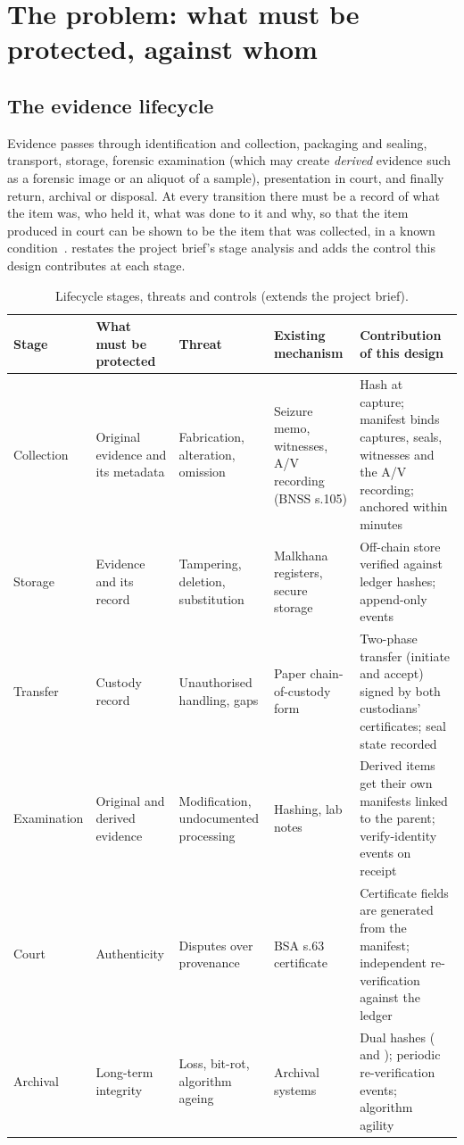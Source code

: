 \section{The problem: what must be protected, against whom}
\label{sec:problem}

\subsection{The evidence lifecycle}
Evidence passes through identification and collection, packaging and sealing, transport, storage, forensic examination (which may create \emph{derived} evidence such as a forensic image or an aliquot of a sample), presentation in court, and finally return, archival or disposal. At every transition there must be a record of what the item was, who held it, what was done to it and why, so that the item produced in court can be shown to be the item that was collected, in a known condition~\cite{iso27037,sopbnss}.  restates the project brief's stage analysis and adds the control this design contributes at each stage.

\begin{table}[htbp]
\centering\small
\begin{tabularx}{\linewidth}{@{}l>{\raggedright}p{2.6cm}>{\raggedright}p{2.5cm}>{\raggedright}p{2.6cm}X@{}}
\toprule
Stage & What must be protected & Threat & Existing mechanism & Contribution of this design \\
\midrule
Collection & Original evidence and its metadata & Fabrication, alteration, omission & Seizure memo, witnesses, A/V recording (BNSS s.105) & Hash at capture; manifest binds captures, seals, witnesses and the A/V recording; anchored within minutes \\
Storage & Evidence and its record & Tampering, deletion, substitution & Malkhana registers, secure storage & Off-chain store verified against ledger hashes; append-only events \\
Transfer & Custody record & Unauthorised handling, gaps & Paper chain-of-custody form & Two-phase transfer (initiate and accept) signed by both custodians' certificates; seal state recorded \\
Examination & Original and derived evidence & Modification, undocumented processing & Hashing, lab notes & Derived items get their own manifests linked to the parent; verify-identity events on receipt \\
Court & Authenticity & Disputes over provenance & BSA s.63 certificate & Certificate fields are generated from the manifest; independent re-verification against the ledger \\
Archival & Long-term integrity & Loss, bit-rot, algorithm ageing & Archival systems & Dual hashes (\shatwo{} and \shathree{}); periodic re-verification events; algorithm agility \\
\bottomrule
\end{tabularx}
\caption{Lifecycle stages, threats and controls (extends the project brief).}
\label{tab:stages}
\end{table}

